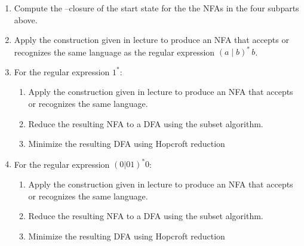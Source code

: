 \documentclass[11pt]{article}
\begin{document}
\begin{enumerate}
    \item Compute the \largeepsilon--closure of the start state for the
          the NFAs in the four subparts above.

    \item Apply the construction given in lecture to produce an NFA that
          accepts or recognizes the same language as the regular expression
          \(
            (a{\mid}b)^* \, b
          \).

   \item For the regular expression $1^*$:

         \vspace{-2.5mm}

         \begin{enumerate}

           \addtolength{\itemsep}{1mm}

           \item Apply the construction given in lecture to produce an NFA that
                 accepts or recognizes the same language.

           \item Reduce the resulting NFA to a DFA using the subset
                 algorithm.

           \item Minimize the resulting DFA using Hopcroft reduction

         \end{enumerate}

         \vspace{-2.5mm}

   \item For the regular expression $(0|01)^*0$:

         \vspace{-2.5mm}

         \begin{enumerate}

           \addtolength{\itemsep}{1mm}

           \item Apply the construction given in lecture to produce an NFA that
                 accepts or recognizes the same language.

           \item Reduce the resulting NFA to a DFA using the subset
                 algorithm.

           \item Minimize the resulting DFA using Hopcroft reduction

         \end{enumerate}

         \vspace{-2.5mm}

  \end{enumerate}
\end{document}
